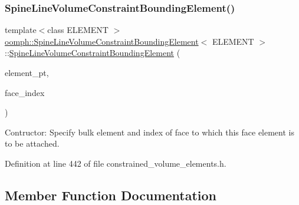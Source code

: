 \subsubsection{\texorpdfstring{Spine\+Line\+Volume\+Constraint\+Bounding\+Element()}{SpineLineVolumeConstraintBoundingElement()}}
{\footnotesize\ttfamily template$<$class E\+L\+E\+M\+E\+NT $>$ \\
\hyperlink{classoomph_1_1SpineLineVolumeConstraintBoundingElement}{oomph\+::\+Spine\+Line\+Volume\+Constraint\+Bounding\+Element}$<$ E\+L\+E\+M\+E\+NT $>$\+::\hyperlink{classoomph_1_1SpineLineVolumeConstraintBoundingElement}{Spine\+Line\+Volume\+Constraint\+Bounding\+Element} (\begin{DoxyParamCaption}\item[{Finite\+Element $\ast$const \&}]{element\+\_\+pt,  }\item[{const int \&}]{face\+\_\+index }\end{DoxyParamCaption})\hspace{0.3cm}{\ttfamily [inline]}}



Contructor\+: Specify bulk element and index of face to which this face element is to be attached. 



Definition at line 442 of file constrained\+\_\+volume\+\_\+elements.\+h.



\subsection{Member Function Documentation}
\mbox{\label{classoomph_1_1SpineLineVolumeConstraintBoundingElement_a9b23d5b98dc459a918045d2a8e221728}} 
